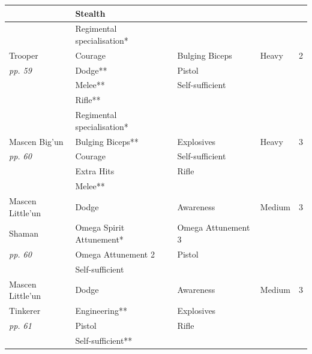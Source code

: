 \begin{table}
\begin{tabular}{|l|l|l|l|l|}
 \hline  & Stealth &  &  &  \\
 \hline  & Regimental specialisation* &  &  &  \\
 \hline Trooper & Courage & Bulging Biceps & Heavy & 2 \\
 \hline \textit{pp. 59} & Dodge** & Pistol &  &  \\
 \hline  & Melee** & Self-sufficient &  &  \\
 \hline  & Rifle** &  &  &  \\
 \hline  & Regimental specialisation* &  &  &  \\
 \hline Mascen Big'un & Bulging Biceps** & Explosives & Heavy & 3 \\
 \hline \textit{pp. 60} & Courage & Self-sufficient &  &  \\
 \hline  & Extra Hits & Rifle &  &  \\
 \hline  & Melee** &  &  &  \\
 \hline Mascen Little'un & Dodge & Awareness & Medium & 3 \\
 \hline Shaman & Omega Spirit Attunement* & Omega Attunement 3 &  &  \\
 \hline \textit{pp. 60} & Omega Attunement 2 & Pistol &  &  \\
 \hline  & Self-sufficient &  &  &  \\
 \hline Mascen Little'un & Dodge & Awareness & Medium & 3 \\
 \hline Tinkerer & Engineering** & Explosives &  &  \\
 \hline \textit{pp. 61} & Pistol & Rifle &  &  \\
 \hline  & Self-sufficient** &  &  &  \\
 \hline \end{tabular}

\end{table}

